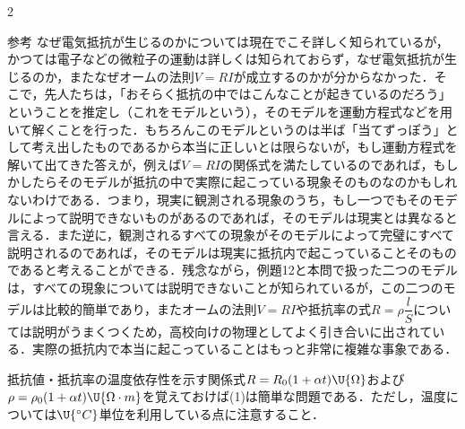 \begin{multicols}{2}
\begin{bsHosoku}{参考}
なぜ電気抵抗が生じるのかについては現在でこそ詳しく知られているが，かつては電子などの微粒子の運動は詳しくは知られておらず，なぜ電気抵抗が生じるのか，またなぜオームの法則$V=RI$が成立するのかが分からなかった．そこで，先人たちは，「おそらく抵抗の中ではこんなことが起きているのだろう」ということを推定し（これをモデルという），そのモデルを運動方程式などを用いて解くことを行った．もちろんこのモデルというのは半ば「当てずっぽう」として考え出したものであるから本当に正しいとは限らないが，もし運動方程式を解いて出てきた答えが，例えば$V=RI$の関係式を満たしているのであれば，もしかしたらそのモデルが抵抗の中で実際に起こっている現象そのものなのかもしれないわけである．つまり，現実に観測される現象のうち，もし一つでもそのモデルによって説明できないものがあるのであれば，そのモデルは現実とは異なると言える．また逆に，観測されるすべての現象がそのモデルによって完璧にすべて説明されるのであれば，そのモデルは現実に抵抗内で起こっていることそのものであると考えることができる．残念ながら，例題12と本問で扱った二つのモデルは，すべての現象については説明できないことが知られているが，この二つのモデルは比較的簡単であり，またオームの法則$V=RI$や抵抗率の式$R=\rho\dfrac{l}{S}$については説明がうまくつくため，高校向けの物理としてよく引き合いに出されている．実際の抵抗内で本当に起こっていることはもっと非常に複雑な事象である．
\end{bsHosoku}

\par\nopagebreak
\begin{sisin}
抵抗値・抵抗率の温度依存性を示す関係式$R=R_0(1+\alpha t)\U{\Omega}$および$\rho=\rho_0(1+\alpha t)\U{\Omega\cdot m}$を覚えておけば(1)は簡単な問題である．ただし，温度については$\U{^\circ C}$単位を利用している点に注意すること．


\end{sisin}
\end{multicols}
